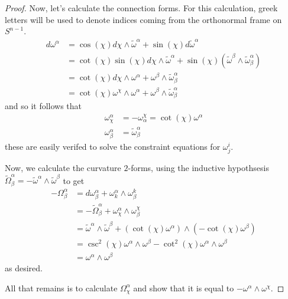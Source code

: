 \documentclass[fontsize=11pt]{scrartcl} %
\numberwithin{equation}{section} %
\numberwithin{figure}{section} %
\numberwithin{table}{section} %
\begin{document}
\begin{proof}
    Now, let's calculate the connection forms. For this calculation, greek
    letters will be used to denote indices coming from the orthonormal frame on
    $S^{n-1}$.
    \[
\begin{aligned}
    d\omega^{\alpha} &= \cos(\chi)d\chi\wedge\tilde{\omega}^{\alpha} +
    \sin(\chi)d\tilde{\omega}^{\alpha}\\
    &= \cot(\chi)\sin(\chi)d\chi\wedge\tilde{\omega}^{\alpha} +
    \sin(\chi)(\tilde{\omega}^{\beta}\wedge\tilde{\omega}^{\alpha}_{\beta})\\
    &= \cot(\chi)d\chi\wedge\omega^{\alpha} +
    \omega^{\beta}\wedge\tilde{\omega}^{\alpha}_{\beta}\\
    &= \cot(\chi)\omega^{\chi}\wedge\omega^{\alpha} +
    \omega^{\beta}\wedge\tilde{\omega}^{\alpha}_{\beta}
\end{aligned}
    \]
    and so it follows that
    \[
\begin{aligned}
    \omega^{\alpha}_{\chi} &= -\omega^{\chi}_{\alpha} =
    \cot(\chi)\omega^{\alpha}\\
    \omega^{\alpha}_{\beta} &= \tilde{\omega}^{\alpha}_{\beta}
\end{aligned}
    \]
    these are easily verifed to solve the constraint equations for $\omega^i_j$.

    Now, we calculate the curvature $2$-forms, using the inductive hypothsesis
    $\tilde{\Omega}^{\alpha}_{\beta} =-
    \tilde{\omega}^{\alpha}\wedge\tilde{\omega}^{\beta}$ to get
    \[
        \begin{aligned}
            -\Omega^{\alpha}_{\beta} &= d\omega^{\alpha}_{\beta} +
            \omega^{\alpha}_k\wedge\omega^k_{\beta}\\
            &= -\tilde{\Omega}^{\alpha}_{\beta} +
            \omega^{\alpha}_{\chi}\wedge\omega^{\chi}_{\beta}\\
            &= \tilde{\omega}^{\alpha}\wedge\tilde{\omega}^{\beta} +
            (\cot(\chi)\omega^{\alpha})\wedge(-\cot(\chi)\omega^{\beta})\\
            &=\csc^2(\chi)\omega^{\alpha}\wedge\omega^{\beta} -
            \cot^2(\chi)\omega^{\alpha}\wedge\omega^{\beta}\\
            &=\omega^{\alpha}\wedge\omega^{\beta}
    \end{aligned}
    \]
    as desired.

    All that remains is to calculate $\Omega^{\alpha}_{\chi}$ and show that it
    is equal to $-\omega^{\alpha}\wedge\omega^{\chi}$.


\end{proof}
\end{document}
